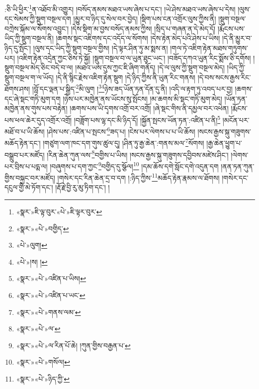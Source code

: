 \documentclass[12pt,a4paper]{book}
\begin{document}
:ཅི་ཡི་ཕྱིར་\footnote{«སྣར་»ཇི་ལྟ་བུར་«པེ་»ཇི་ལྟར་བུར་}ན་འཐོབ་མི་འགྱུར། །བསོད་ནམས་མཐའ་ཡས་ཞེས་པ་དང་། །ཡེ་ཤེས་མཐའ་ཡས་ཞེས་པ་དེས། །ལུས་དང་སེམས་ཀྱི་སྡུག་བསྔལ་དག །མྱུར་བ་ཉིད་དུ་སེལ་བར་བྱེད། །སྡིག་པས་ངན་འགྲོར་ལུས་ཀྱིས་ནི། །སྡུག་བསྔལ་བཀྲེས་སྐོམ་ལ་སོགས་འབྱུང་། །དེས་སྡིག་མ་བྱས་བསོད་ནམས་ཀྱིས། །སྲིད་པ་གཞན་ན་དེ་མེད་དོ། །རྨོངས་པས་ཡིད་ཀྱི་སྡུག་བསྔལ་ནི། །ཆགས་སྡང་འཇིགས་དང་འདོད་ལ་སོགས། །དེས་རྟེན་མེད་པའི་ཤེས་པ་ཡིས། །དེ་ནི་མྱུར་བ་ཉིད་དུ་སྤོང་། །ལུས་དང་ཡིད་ཀྱི་སྡུག་བསྔལ་གྱིས། །དེ་ལྟར་ཤིན་ཏུ་མ་སྨས་ན། །གལ་ཏེ་འཇིག་རྟེན་མཐས་གཏུགས་པར། །འཇིག་རྟེན་འདྲེན་ཀྱང་ཅིས་ཏེ་སྐྱོ། །སྡུག་བསྔལ་བ་ལ་ཡུན་ཐུང་ཡང་། །བཟོད་དཀའ་ཡུན་རིང་སྨོས་ཅི་དགོས། །སྡུག་བསྔལ་མེད་ཅིང་བདེ་བ་ལ། །མཐའ་ཡས་དུས་ཀྱང་ཇི་ཞིག་གནོད། །དེ་ལ་ལུས་ཀྱི་སྡུག་བསྔལ་མེད། །ཡིད་ཀྱི་སྡུག་བསྔལ་ག་ལ་ཡོད། །དེ་ནི་སྙིང་རྗེས་འཇིག་རྟེན་སྡུག །དེ་ཉིད་ཀྱིས་ནི་ཡུན་རིང་གནས། །དེ་བས་སངས་རྒྱས་རིང་ཐོགས་ཤས། །བློ་དང་ལྡན་པ་སྒྱིད་\footnote{«སྣར་»«པེ་»བགྱིད་}མི་ལུག །\footnote{«པེ་»ལུག།}\footnote{«པེ་»།ས། །}ཉེས་ཟད་ཡོན་ཏན་དོན་དུ་ནི། །འདི་ལ་རྟག་ཏུ་འབད་པར་བྱ། །ཆགས་དང་ཞེ་སྡང་གཏི་མུག་དག །ཉེས་པར་མཁྱེན་ནས་ཡོངས་སུ་སྤོངས། །མ་ཆགས་མི་སྡང་གཏི་མུག་མེད། །ཡོན་ཏན་མཁྱེན་ནས་གུས་པས་བརྟེན། །ཆགས་པས་ཡི་དྭགས་འགྲོ་བར་འགྲོ། །ཞེ་སྡང་གིས་ནི་དམྱལ་བར་འཕེན། །རྨོངས་པས་ཕལ་ཆེར་དུད་འགྲོར་འགྲོ། །བཟློག་པས་ལྷ་དང་མི་ཉིད་དོ། །སྐྱོན་སྤངས་ཡོན་ཏན་:འཛིན་པ་ནི།\footnote{«སྣར་»«པེ་»འཛིན་པ་ཡིས།} །མངོན་པར་མཐོ་བ་པ་ཡི་ཆོས། །ཤེས་པས་:འཛིན་པ་སྤངས་\footnote{«སྣར་»«པེ་»འཛིན་པ་ཡང་}ཟད་པ། །ངེས་པར་ལེགས་པ་པ་ཡི་ཆོས། །སངས་རྒྱས་སྐུ་གཟུགས་མཆོད་རྟེན་དང་། །གཙུག་ལག་ཁང་དག་གུས་ཚུལ་དུ། །ཤིན་ཏུ་རྒྱ་ཆེན་:གནས་མལ་\footnote{«སྣར་»«པེ་»གནས་ལམ་}སོགས། །རྒྱ་ཆེན་ཕྱུག་པ་བསྒྲུབ་པར་མཛོད། །རིན་ཆེན་ཀུན་ལས་\footnote{«སྣར་»«པེ་»ལ་}བགྱིས་པ་ཡིས། །སངས་རྒྱས་སྐུ་གཟུགས་དབྱིབས་མཛེས་ཤིང་། །ལེགས་པར་བྲིས་པ་པདྨ་ལ། །བཞུགས་པ་དག་ཀྱང་\footnote{«སྣར་»«པེ་»ལ་རིན་པོ་ཆེ། །ཀུན་གྱིས་བརྒྱན་པ་}བགྱིད་དུ་སྩོལ།\footnote{«སྣར་»«པེ་»གསོལ།} །དམ་ཆོས་དགེ་སློང་དགེ་འདུན་དག །ནན་ཏན་ཀུན་གྱིས་བསྐྱང་བར་མཛོད། །གསེར་དང་རིན་ཆེན་དྲ་བ་དག །:ཉིད་ཀྱིས་\footnote{«སྣར་»«པེ་»ཉིད་ཀྱི་}མཆོད་རྟེན་རྣམས་ལ་ཐོགས། །གསེར་དང་དངུལ་གྱི་མེ་ཏོག་དང་། །རྡོ་རྗེ་བྱི་རུ་མུ་ཏིག་དང་། །
\end{document}
